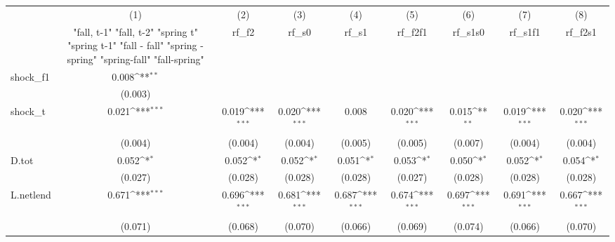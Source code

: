 {
\def\sym#1{\ifmmode^{#1}\else\(^{#1}\)\fi}
\begin{tabular}{l*{8}{c}}
\toprule
            &\multicolumn{1}{c}{(1)}&\multicolumn{1}{c}{(2)}&\multicolumn{1}{c}{(3)}&\multicolumn{1}{c}{(4)}&\multicolumn{1}{c}{(5)}&\multicolumn{1}{c}{(6)}&\multicolumn{1}{c}{(7)}&\multicolumn{1}{c}{(8)}\\
            &\multicolumn{1}{c}{  "fall, t-1" "fall, t-2" "spring t" "spring t-1"  "fall - fall" "spring - spring" "spring-fall" "fall-spring" }&\multicolumn{1}{c}{rf\_f2}&\multicolumn{1}{c}{rf\_s0}&\multicolumn{1}{c}{rf\_s1}&\multicolumn{1}{c}{rf\_f2f1}&\multicolumn{1}{c}{rf\_s1s0}&\multicolumn{1}{c}{rf\_s1f1}&\multicolumn{1}{c}{rf\_f2s1}\\
\midrule
shock\_f1    &       0.008\sym{**} &                     &                     &                     &                     &                     &                     &                     \\
            &     (0.003)         &                     &                     &                     &                     &                     &                     &                     \\
\addlinespace
shock\_t     &       0.021\sym{***}&       0.019\sym{***}&       0.020\sym{***}&       0.008         &       0.020\sym{***}&       0.015\sym{**} &       0.019\sym{***}&       0.020\sym{***}\\
            &     (0.004)         &     (0.004)         &     (0.004)         &     (0.005)         &     (0.005)         &     (0.007)         &     (0.004)         &     (0.004)         \\
\addlinespace
D.tot       &       0.052\sym{*}  &       0.052\sym{*}  &       0.052\sym{*}  &       0.051\sym{*}  &       0.053\sym{*}  &       0.050\sym{*}  &       0.052\sym{*}  &       0.054\sym{*}  \\
            &     (0.027)         &     (0.028)         &     (0.028)         &     (0.028)         &     (0.027)         &     (0.028)         &     (0.028)         &     (0.028)         \\
\addlinespace
L.netlend   &       0.671\sym{***}&       0.696\sym{***}&       0.681\sym{***}&       0.687\sym{***}&       0.674\sym{***}&       0.697\sym{***}&       0.691\sym{***}&       0.667\sym{***}\\
            &     (0.071)         &     (0.068)         &     (0.070)         &     (0.066)         &     (0.069)         &     (0.074)         &     (0.066)         &     (0.070)         \\

\end{tabular}}
